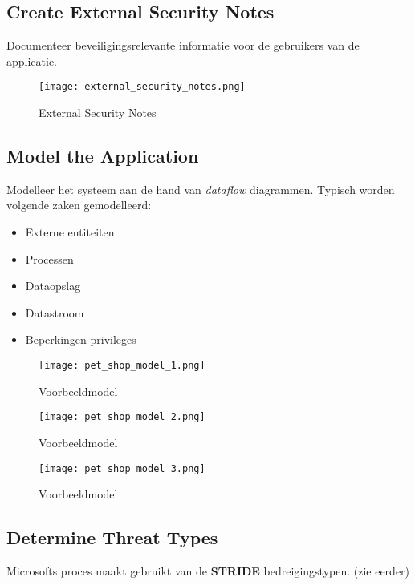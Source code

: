 \documentclass[../main.tex]{subfiles}
\begin{document}
\subsection{Create External Security Notes}
Documenteer beveiligingsrelevante informatie voor de gebruikers van de applicatie.
\begin{figure}[H]
    \centering
    \texttt{[image: external\_security\_notes.png]}
    \caption{External Security Notes}
    \label{fig:external_security_notes}
\end{figure}

\subsection{Model the Application}
Modelleer het systeem aan de hand van \textit{dataflow} diagrammen. Typisch worden volgende zaken gemodelleerd:
\begin{multicols}{2}
\begin{itemize}
	\item Externe entiteiten
	\item Processen
	\item Dataopslag
	\item Datastroom
	\item Beperkingen privileges
\end{itemize}
\end{multicols}

\begin{figure}[H]
    \centering
    \texttt{[image: pet\_shop\_model\_1.png]}
    \caption{Voorbeeldmodel}
    \label{example1}
\end{figure}

\begin{figure}[H]
    \centering
    \texttt{[image: pet\_shop\_model\_2.png]}
    \caption{Voorbeeldmodel}
    \label{example2}
\end{figure}

\begin{figure}[H]
    \centering
    \texttt{[image: pet\_shop\_model\_3.png]}
    \caption{Voorbeeldmodel}
    \label{example3}
\end{figure}

\subsection{Determine Threat Types}
Microsofts proces maakt gebruikt van de  \textbf{STRIDE} bedreigingstypen. (zie eerder)
\end{document}
